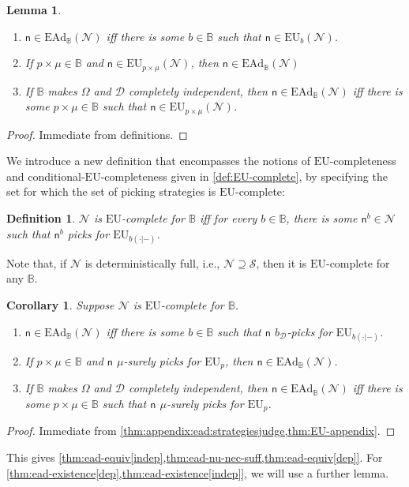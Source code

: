 \documentclass[a4paper]{article}
\newtheorem{definition}{Definition}
\newtheorem{lemma}[theorem]{Lemma}
\newtheorem{corollary}[theorem]{Corollary}
\newcommand\EU{\mathrm{EU}}
\newcommand\EAd{\mathrm{EAd}}
\newcommand{\Decs}{\mathcal{D}}
\renewcommand\S{\mathcal{S}}
\newcommand{\n}{\mathsf{n}}
\renewcommand{\nu}{\n}
\newcommand\Nu{\mathcal{N}}
\newcommand{\IB}{\mathbb{B}}
\newenvironment{CCM rewritten}
{\begingroup\color{blue}} %
{\endgroup}              %
\begin{document}
\begin{lemma}\label{thm:appendix:ead:strategiesjudge}\ 
	\begin{enumerate}[label=\normalfont(\roman*), ref=\roman*]
		\item $\nu\in\EAd_\IB(\Nu)$ iff there is some $b\in\IB$ such that $\nu\in\EU_b(\Nu)$.  
		\item If $p\times\mu\in \IB$ and $\nu\in\EU_{p\times\mu}(\Nu)$, then $\nu\in\EAd_\IB(\Nu)$ 
		\item If $\IB$ makes $\Omega$ and $\Decs$ completely independent, then $\nu\in\EAd_\IB(\Nu)$ iff there is some $p\times\mu\in\IB$ such that $\nu\in\EU_{p\times\mu}(\Nu)$.  
	\end{enumerate}
\end{lemma}
\begin{proof}
	Immediate from definitions. 
\end{proof}
We introduce a new definition that encompasses the notions of $\EU$-completeness and conditional-$\EU$-completeness given in \cref{def:EU-complete}, by specifying the set for which the set of picking strategies is $\EU$-complete: 
\begin{definition}
	$\Nu$ is $\EU$-complete for $\IB$ iff for every $b\in\IB$, there is some $\nu^b\in\Nu$ such that $\nu^b$ picks for $\EU_{b(\cdot|-)}$. 
\end{definition}
Note that, if $\Nu$ is deterministically full, i.e., $\Nu\supseteq\S$, then it is $\EU$-complete for any $\IB$. 
\begin{corollary}\label{thm:appendix:ead:eu}
	Suppose $\Nu$ is $\EU$-complete for $\IB$.
	\begin{enumerate}[label=\normalfont(\roman*), ref=(\roman*)]
		\item $\nu\in\EAd_\IB(\Nu)$ iff there is some $b\in\IB$ such that $\nu$ $b_\Decs$-picks for $\EU_{b(\cdot|-)}$.  
		\item \label{itm:ead:2}If $p\times\mu\in \IB$ and $\nu$ $\mu$-surely picks for $\EU_p$, then $\nu\in\EAd_\IB(\Nu)$.
		\item If $\IB$ makes $\Omega$ and $\Decs$ completely independent, then $\nu\in\EAd_\IB(\Nu)$ iff there is some $p\times\mu\in\IB$ such that $\nu$ $\mu$-surely picks for $\EU_p$.
	\end{enumerate}
\end{corollary}
\begin{proof}
	Immediate from \cref{thm:appendix:ead:strategiesjudge,thm:EU-appendix}.
\end{proof}
This gives \cref{thm:ead-equiv[indep],thm:ead-nu-nec-suff,thm:ead-equiv[dep]}. For \cref{thm:ead-existence[dep],thm:ead-existence[indep]}, we will use a further lemma. 
\end{document}
